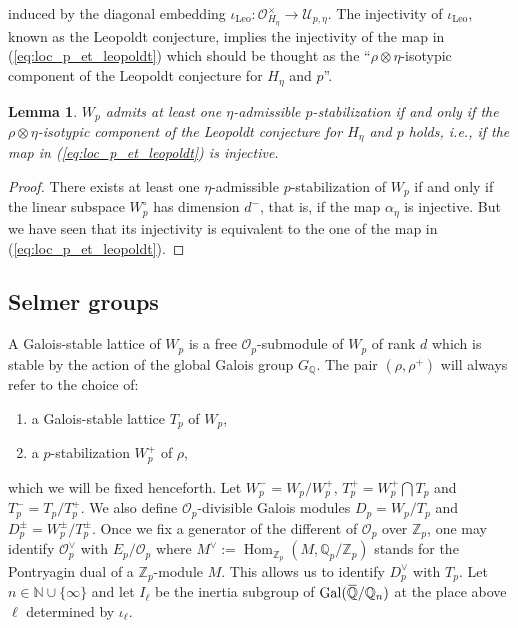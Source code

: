 \documentclass[12pt]{amsart}
\newcommand\bN{\mathbb{N}}
\newcommand\bQ{\mathbb{Q}}
\newcommand\Zp{{\mathbb{Z}_p}}
\newcommand\Qp{{\mathbb{Q}_p}}
\newcommand\cO{\mathcal{O}}
\newcommand\cU{\mathcal{U}}
\newcommand{\ob}[1]{\mkern 1.5mu\overline{\mkern-1.5mu#1\mkern-1.5mu}\mkern 1.5mu}
\DeclareMathOperator{\Gal}{Gal}
\DeclareMathOperator{\Hom}{Hom}
\theoremstyle{defstyle}
\theoremstyle{thmstyle}
\newtheorem{lemme}[subsubsection]{Lemma}
\begin{document}
induced by the diagonal embedding $\iota_{\textrm{Leo}}:\cO_{H_\eta}^\times \longrightarrow \cU_{p,\eta}$. The injectivity of $\iota_\textrm{Leo}$, known as the Leopoldt conjecture, implies the injectivity of the map in  (\ref{eq:loc_p_et_leopoldt}) which should be thought as the ``$\rho\otimes\eta$-isotypic component of the Leopoldt conjecture for $H_\eta$ and $p$''. 
\begin{lemme}\label{lem:existence_p_stabilization}
	$W_p$ admits at least one $\eta$-admissible $p$-stabilization if and only if the $\rho\otimes\eta$-isotypic component of the Leopoldt conjecture for $H_\eta$ and $p$ holds, \textit{i.e.}, if the map in  (\ref{eq:loc_p_et_leopoldt}) is injective.
\end{lemme}
\begin{proof}
	There exists at least one $\eta$-admissible $p$-stabilization of $W_p$ if and only if the linear subspace $W_p^{\circ}$ has dimension $d^-$, that is, if the map $\alpha_\eta$ is injective. But we have seen that its injectivity is equivalent to the one of the map in (\ref{eq:loc_p_et_leopoldt}).
\end{proof}

\subsection{Selmer groups} \label{sec:selmer_group}
A Galois-stable lattice of $W_p$ is a free $\cO_p$-submodule of $W_p$ of rank $d$ which is stable by the action of the global Galois group $G_\bQ$. The pair $(\rho,\rho^+)$ will always refer to the choice of:
\begin{enumerate}
	\item a Galois-stable lattice $T_p$ of $W_p$,
	\item a $p$-stabilization $W_p^+$ of $\rho$,
\end{enumerate}

which we will be fixed henceforth. Let $W_p^-=W_p/W_p^+$, $T_p^+=W_p^+ \bigcap T_p$ and $T_p^-=T_p/T_p^+$. We also define $\cO_p$-divisible Galois modules $D_p=W_p/T_p$ and  $D_p^\pm=W_p^\pm/T_p^\pm$. Once we fix a generator of the different of $\cO_p$ over $\Zp$, one may identify $\cO_p^\vee$ with $E_p/\cO_p$ where $M^\vee:=\Hom_\Zp(M,\Qp/\Zp)$ stands for the Pontryagin dual of a $\Zp$-module $M$. This allows us to identify $D_p^\vee$ with $T_p$. Let $n\in \bN \cup\{\infty\}$ and let $I_\ell$ be the inertia subgroup of $\Gal(\ob{\bQ}/\bQ_n)$ at the place above $\ell$ determined by $\iota_\ell$. 
\end{document}
